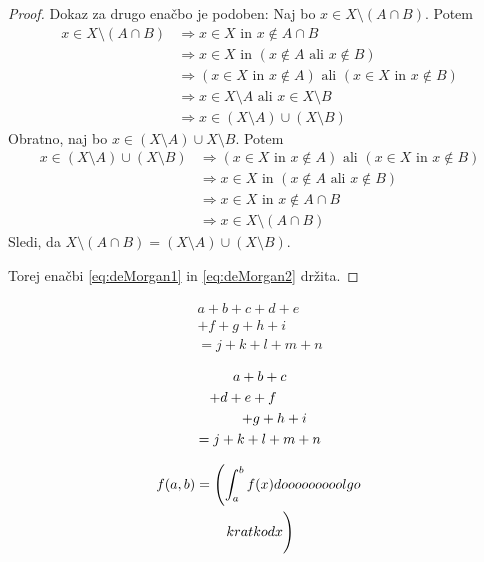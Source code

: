 \documentclass[12pt]{article}
\theoremstyle{plain}
\theoremstyle{definition}
\theoremstyle{remark}
\begin{document}
\begin{proof}
  Dokaz za drugo enačbo je podoben: 
  Naj bo $x \in X\setminus (A \cap B)$. Potem 
  \begin{align*}
    x \in X\setminus (A \cap B)
    & \Rightarrow x \in X \text{ in } x \notin A \cap B \\
    & \Rightarrow x \in X \text{ in } (x \notin A \text{ ali } x \notin B) \\
    & \Rightarrow  (x \in X \text{ in } x \notin A) \text{ ali } (x \in X \text{ in } x \notin B) \\
    & \Rightarrow x \in X \setminus A \text{ ali } x \in X \setminus B \\
    & \Rightarrow  x \in (X \setminus A) \cup (X \setminus B)
  \end{align*}
%  
Obratno, naj bo $x \in (X \setminus A) \cup X \setminus B$. Potem 
  \begin{align*}
    x \in (X \setminus A) \cup (X \setminus B)
    & \Rightarrow (x \in X \text{ in } x \notin A) \text{ ali } (x \in X \text{ in } x \notin B) \\
    & \Rightarrow x \in X \text{ in } (x \notin A \text{ ali } x \notin B) \\
    & \Rightarrow x \in X \text{ in } x \notin A \cap B \\
    & \Rightarrow x \in X\setminus (A \cap B)
  \end{align*}
  Sledi, da $X\setminus (A\cap B) = (X \setminus A) \cup (X \setminus B)$.

  Torej enačbi \ref{eq:deMorgan1} in \ref{eq:deMorgan2} držita.
\end{proof}

\vspace{2cm}

\begin{minipage}{0.5\textwidth}
\begin{multline*}
  a + b + c + d + e \\
  + f + g + h + i \\
  = j + k + l + m + n
  \end{multline*}
\end{minipage}

\vspace{2cm}

\begin{minipage}{0.5\textwidth}
\begin{multline*}
    a + b + c \\
    \shoveleft{+ d + e + f} \\
    \shoveright{+ g + h + i} \\
    = j + k + l + m + n
\end{multline*}
\end{minipage}

\vspace{2cm}

\begin{minipage}{0.5\textwidth}
  \begin{multline*}
    f(a, b) = \left(
    \int_a^b f(x)
    dooooooooolgo
    \right. \\
    \left.
    \vphantom{
    \int_a^b f(x)
    dooooooooolgo
    }
    kratko d x
    \right)
  \end{multline*}
\end{minipage}
\end{document}
